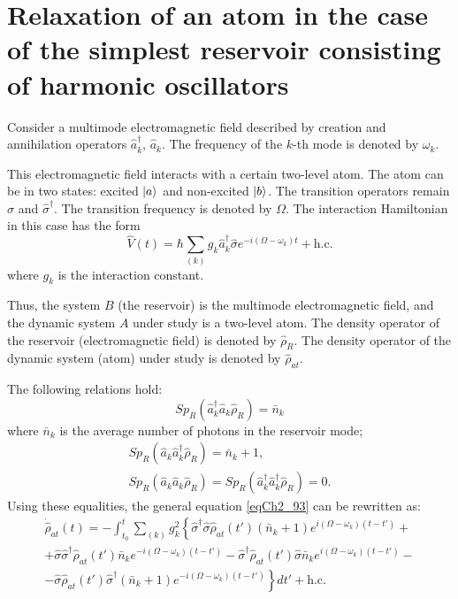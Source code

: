 \section{Relaxation of an atom in the case of the simplest
  reservoir consisting of harmonic oscillators}
Consider a multimode electromagnetic field described by creation and annihilation operators $\hat{a}_k^{\dag}$,
$\hat{a}_k$. The frequency of the $k$-th mode is denoted by $\omega_k$. 

This electromagnetic field interacts with a certain two-level
atom. The atom can be in two states: 
excited $\ket{a}$ and non-excited
$\ket{b}$. The transition operators remain 
$\hat{\sigma}$ and $\hat{\sigma}^{\dag}$. The transition frequency is denoted by
$\Omega$. The interaction Hamiltonian in this case has the form  
\begin{equation}
\hat{V}\left(t\right) = \hbar
\sum_{(k)} g_k \hat{a}_k^{\dag} \hat{\sigma}e^{-i \left(
\Omega - \omega_k
\right) t} +
\mbox{h.c.}
\label{eqCh2_94}
\end{equation}
where $g_k$ is the interaction constant.

Thus, the system $B$ (the reservoir) is the multimode
electromagnetic field, and the dynamic system $A$ under study is a
two-level atom. The density operator of the reservoir (electromagnetic
field) is denoted by $\hat{\rho}_R$. The density operator of the dynamic
system (atom) under study is denoted by $\hat{\rho}_{at}$.

The following relations hold:
\begin{equation}
Sp_R\left(
\hat{a}_k^{\dag}
\hat{a}_k
\hat{\rho}_R
\right) = \bar{n}_k
\label{eqCh2_96}
\end{equation}
where $\bar{n}_k$ is the
average number of photons in the reservoir mode; 
\begin{eqnarray}
Sp_R\left(\hat{a}_k\hat{a}_k^{\dag}\hat{\rho}_R\right) = \bar{n}_k + 1,
\nonumber \\
Sp_R\left(\hat{a}_k\hat{a}_k\hat{\rho}_R\right) = 
Sp_R\left(\hat{a}_k^{\dag}\hat{a}_k^{\dag}\hat{\rho}_R\right) = 0.
\label{eqCh2_96_add}
\end{eqnarray}
Using these equalities, the general equation
\eqref{eqCh2_93} can be rewritten as:  
\begin{eqnarray}
\dot{\hat{\rho}}_{at}\left(t\right) = 
- \int_{t_0}^t\sum_{(k)}g_k^2
\left\{
\hat{\sigma}^{\dag} \hat{\sigma}\hat{\rho}_{at}\left(t'\right)
\left(
\bar{n}_k + 1
\right)
e^{i\left(\Omega - \omega_k\right)
\left(t - t'\right)}
+
\right.
\nonumber \\
\left.
+\hat{\sigma}\hat{\sigma}^{\dag}
\hat{\rho}_{at}\left(t'\right)
\bar{n}_k
e^{-i\left(\Omega - \omega_k\right)
\left(t - t'\right)} -
\hat{\sigma}^{\dag}
\hat{\rho}_{at}\left(t'\right)
\hat{\sigma}
\bar{n}_k
e^{i\left(\Omega - \omega_k\right)
\left(t - t'\right)}
-
\right.
\nonumber \\
-
\left.
\hat{\sigma}
\hat{\rho}_{at}\left(t'\right)
\hat{\sigma}^{\dag}
\left(\bar{n}_k + 1\right)
e^{-i\left(\Omega - \omega_k\right)
\left(t - t'\right)}
\right\}dt'
+ \mbox{h.c.}
\label{eqCh2_97}
\end{eqnarray}

